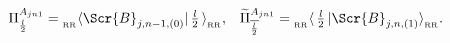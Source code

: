 \begin{equation}
\Pi^{A_{jn1}}_{l\over 2}
={}^{}_{{}_{\rm RR}}\langle \Scr{B}_{j,n-1,(0)}|\,
\mbox{${l\over 2}$}\,\rangle^{}_{{}_{\rm RR}},
\,\,\,\,\,
\widetilde{\Pi}^{A_{jn1}}_{\overline{l\over 2}}
={}^{}_{{}_{\rm RR}}\langle \,\mbox{${l\over 2}$}\, 
|\Scr{B}_{j,n,(1)}\rangle^{}_{{}_{\rm RR}}.
\end{equation}

